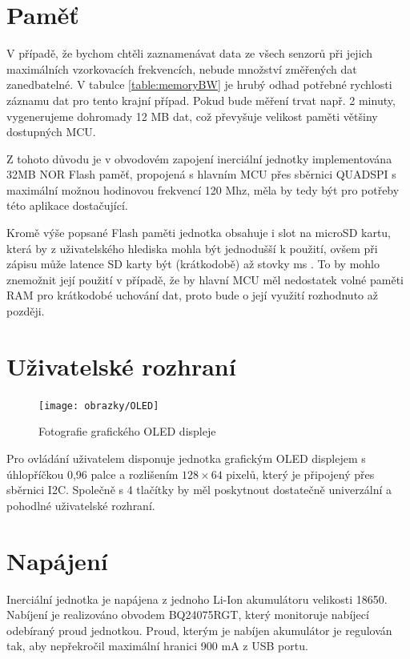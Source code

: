 \section{Paměť}

V případě, že bychom chtěli zaznamenávat data ze všech senzorů při jejich maximálních vzorkovacích frekvencích, nebude množství změřených dat zanedbatelné. V tabulce \ref{table:memoryBW} je hrubý odhad potřebné rychlosti záznamu dat pro tento krajní případ. Pokud bude měření trvat např. 2 minuty, vygenerujeme dohromady 12 MB dat, což převyšuje velikost paměti většiny dostupných \ac{MCU}.

Z tohoto důvodu je v obvodovém zapojení inerciální jednotky implementována 32MB NOR Flash paměť, propojená s hlavním \ac{MCU} přes sběrnici QUADSPI s maximální možnou hodinovou frekvencí 120 Mhz, měla by tedy být pro potřeby této aplikace dostačující. \cite{CgaRYSTpwKhEZZr7}

Kromě výše popsané Flash paměti jednotka obsahuje i slot na microSD kartu, která by z uživatelského hlediska mohla být jednodušší k použití, ovšem při zápisu může latence SD karty být (krátkodobě) až stovky ms \cite{Kraewinkel2020}. To by mohlo znemožnit její použití v případě, že by hlavní \ac{MCU} měl nedostatek volné paměti RAM pro krátkodobé uchování dat, proto bude o její využití rozhodnuto až později.

\section{Uživatelské rozhraní}
\begin{figure}[h]
    \centering
    \texttt{[image: obrazky/OLED]}
    \caption{Fotografie grafického OLED displeje}
\end{figure}
Pro ovládání uživatelem disponuje jednotka grafickým \ac{OLED} displejem s úhlopříčkou 0,96 palce a rozlišením $ 128 \times 64 $ pixelů, který je připojený přes sběrnici \ac{I2C}. Společně s 4 tlačítky by měl poskytnout dostatečně univerzální a pohodlné uživatelské rozhraní.

\section{Napájení} \label{napajeni}
Inerciální jednotka je napájena z jednoho Li-Ion akumulátoru velikosti 18650. Nabíjení je realizováno obvodem BQ24075RGT, který monitoruje nabíjecí odebíraný proud jednotkou. Proud, kterým je nabíjen akumulátor je regulován tak, aby nepřekročil maximální hranici 900 mA z USB portu. \cite{F5eZCtr2LLRsr9NT}

